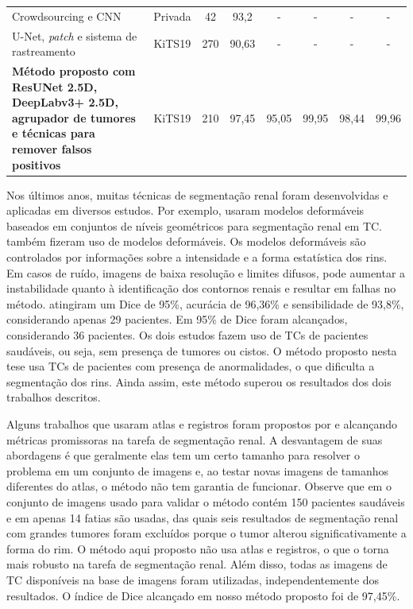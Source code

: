\begin{table}[!ht]
{\begin{tabular}{p{11cm}ccccccc}
Crowdsourcing e CNN \cite{mehta2019segmenting}                                                                            & Privada       & 42                 & 93,2               & -                  & -                 & -                 & -                 \\
U-Net, \textit{patch} e sistema de rastreamento \cite{9534007}                                                            & KiTS19        & 270                & 90,63              & -                  & -                 & -                 & -                 \\ \hline
\textbf{Método proposto com ResUNet 2.5D, DeepLabv3+ 2.5D, agrupador de tumores e técnicas para remover falsos positivos} & KiTS19        & 210                & 97,45              & 95,05              & 99,95             & 98,44             & 99,96             \\ \hline
\end{tabular}
}
\end{table}

Nos últimos anos, muitas técnicas de segmentação renal foram desenvolvidas e aplicadas em diversos estudos. Por exemplo,   usaram modelos deformáveis baseados em conjuntos de níveis geométricos para segmentação renal em TC.  também fizeram uso de modelos deformáveis. Os modelos deformáveis são controlados por informações sobre a intensidade e a forma estatística dos rins. Em casos de ruído, imagens de baixa resolução e limites difusos, pode aumentar a instabilidade quanto à identificação dos contornos renais e resultar em falhas no método.  atingiram um Dice de 95\%, acurácia de 96,36\% e sensibilidade de 93,8\%, considerando apenas 29 pacientes. Em  95\% de Dice foram alcançados, considerando 36 pacientes. Os dois estudos fazem uso de TCs de pacientes saudáveis, ou seja, sem presença de tumores ou cistos. O método proposto nesta tese usa TCs de pacientes com presença de anormalidades, o que dificulta a segmentação dos rins. Ainda assim, este método superou os resultados dos dois trabalhos descritos.

Alguns trabalhos que usaram atlas e registros foram propostos por  e  alcançando métricas promissoras na tarefa de segmentação renal. A desvantagem de suas abordagens é que geralmente elas tem um certo tamanho para resolver o problema em um conjunto de imagens e, ao testar novas imagens de tamanhos diferentes do atlas, o método não tem garantia de funcionar. Observe que em  o conjunto de imagens usado para validar o método contém 150 pacientes saudáveis e em  apenas 14 fatias são usadas, das quais seis resultados de segmentação renal com grandes tumores foram excluídos porque o tumor alterou significativamente a forma do rim. O método aqui proposto não usa atlas e registros, o que o torna mais robusto na tarefa de segmentação renal. Além disso, todas as imagens de TC disponíveis na base de imagens foram utilizadas, independentemente dos resultados. O índice de Dice alcançado em nosso método proposto foi de 97,45\%.


